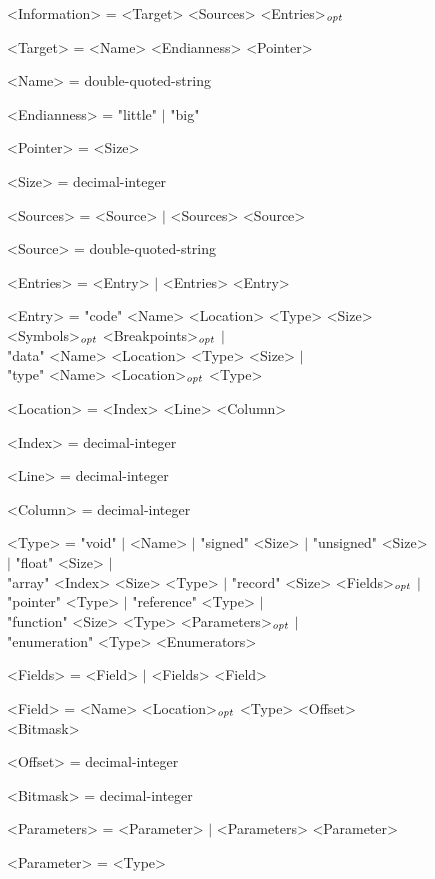 \begin{figure}
\centering\ifbook\small\fi\setlength{\grammarparsep}{0ex}
\begin{minipage}{34em}\begin{grammar}
<Information> = <Target> <Sources> <Entries>$_\mathit{opt}$ \par
<Target> = <Name> <Endianness> <Pointer> \par
<Name> = double-quoted-string \par
<Endianness> = "little" $\mid$ "big" \par
<Pointer> = <Size> \par
<Size> = decimal-integer \par
<Sources> = <Source> $\mid$ <Sources> <Source> \par
<Source> = double-quoted-string \par
<Entries> = <Entry> $\mid$ <Entries> <Entry> \par
<Entry> = "code" <Name> <Location> <Type> <Size> <Symbols>$_\mathit{opt}$ <Breakpoints>$_\mathit{opt}$ $\mid$ \\ "data" <Name> <Location> <Type> <Size> $\mid$ \\ "type" <Name> <Location>$_\mathit{opt}$ <Type> \par
<Location> = <Index> <Line> <Column> \par
<Index> = decimal-integer \par
<Line> = decimal-integer \par
<Column> = decimal-integer \par
<Type> = "void" $\mid$ <Name> $\mid$ "signed" <Size> $\mid$ "unsigned" <Size> $\mid$ "float" <Size> $\mid$ \\ "array" <Index> <Size> <Type> $\mid$ "record" <Size> <Fields>$_\mathit{opt}$ $\mid$ \\ "pointer" <Type> $\mid$ "reference" <Type> $\mid$ \\ "function" <Size> <Type> <Parameters>$_\mathit{opt}$ $\mid$ \\ "enumeration" <Type> <Enumerators> \par
<Fields> = <Field> $\mid$ <Fields> <Field> \par
<Field> = <Name> <Location>$_\mathit{opt}$ <Type> <Offset> <Bitmask> \par
<Offset> = decimal-integer \par
<Bitmask> = decimal-integer \par
<Parameters> = <Parameter> $\mid$ <Parameters> <Parameter> \par
<Parameter> = <Type> \par

\end{grammar}
\end{minipage}
\end{figure}
